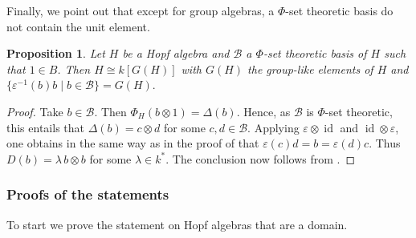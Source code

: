 \documentclass[a4paper,10pt]{amsart}
\newtheorem{proposition}[lemma]{Proposition}
\theoremstyle{definition}
\theoremstyle{remark}
\DeclareMathOperator{\id}{id}
\newcommand\D{\Delta}
\newcommand\eps{\varepsilon}
\newcommand\ot{\otimes}
\newcommand\mc{\mathcal}
\begin{document}
Finally, we point out that except for group algebras, a $\Phi$-set theoretic basis do not contain the unit element.

\begin{proposition}\label{lem:unit-obstruction}
Let $H$ be a Hopf algebra and $\mc{B}$ a $\Phi$-set theoretic basis of $H$ such that $1\in B$. Then $H\cong k[G(H)]$ with $G(H)$ the group-like elements of $H$ and $\{\eps^{-1}(b)b \mid b \in \mc{B} \}=G(H).$
\end{proposition}
\begin{proof}
Take $b\in \mc{B}$. Then $\Phi_H(b \ot 1) = \D(b)$. Hence, as $\mc{B}$ is $\Phi$-set theoretic, this entails that $\D(b) = c \ot d$ for some $c,d \in  \mc{B}$. Applying $\eps\otimes \id$ and $\id\ot \eps$, one obtains in the same way as in the proof of   that $\eps(c)d=b = \eps(d)c$. Thus $D(b) = \lambda\, b \ot b$ for some $\lambda \in k^*$. The conclusion now follows from .
\end{proof}




\subsubsection{Proofs of the statements}\label{section of proofs domain case}

To start we prove the statement on Hopf algebras that are a domain.
\end{document}
